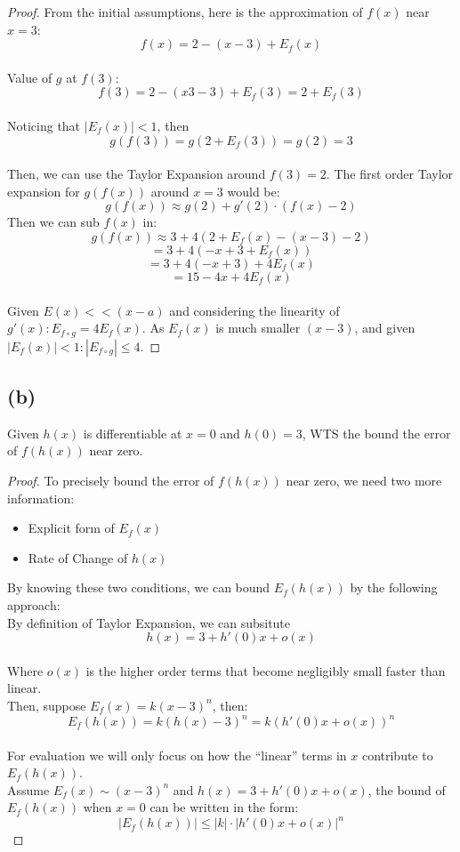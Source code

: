 \documentclass{article}
\begin{document}
\begin{proof}
    From the initial assumptions, here is the approximation of $f(x)$ near $x = 3$: 
    \[f(x) = 2 - (x - 3) + E_f(x)\]
    \\
    Value of $g$ at $f(3)$:
    \[ f(3) = 2 - (x3- 3) + E_f(3) = 2 + E_f(3) \]
    \\
    Noticing that $|E_f(x)| < 1$, then
    \[ g(f(3)) = g(2 + E_f(3)) = g(2) = 3 \]
    \\
    Then, we can use the Taylor Expansion around $f(3) = 2$. 
    The first order Taylor expansion for $g(f(x))$ around $x = 3$ would be:
    \[ g(f(x)) \approx g(2) + g'(2) \cdot (f(x) - 2) \]
    Then we can sub $f(x)$ in:
    \[ g(f(x)) \approx 3 + 4(2 + E_f(x) - (x - 3) - 2) \]
    \[ = 3 + 4(-x + 3 + E_f(x)) \]
    \[ = 3 + 4(-x + 3) + 4E_f(x) \]
    \[ = 15 - 4x + 4E_f(x) \]
    \\
    Given $E(x) << (x - a)$  and considering the linearity of \( g'(x): E_{f \circ g} = 4E_f(x) \).
    As $E_f(x)$ is much smaller $(x - 3)$, and given $|E_f(x)| < 1: |E_{f \circ g}| \leq 4$.
\end{proof}

\newpage

\subsection*{(b)}
Given $h(x)$ is differentiable at $x = 0$ and $h(0) = 3$, WTS       the bound the
error of $f(h(x))$ near zero.
\\
\begin{proof}
    To precisely bound the error of $f(h(x))$ near zero, we need two more information:
    \begin{itemize}
        \item Explicit form of $E_f(x)$
        \item Rate of Change of $h(x)$
    \end{itemize}

    By knowing these two conditions, we can bound $E_f(h(x))$ by the following approach:
    \\
    By definition of Taylor Expansion, we can subsitute
    \[ h(x) = 3 + h'(0)x + o(x) \]
    \\
    Where $o(x)$ is the higher order terms that become negligibly small faster than linear.
    \\
    Then, suppose $E_f(x) = k(x - 3)^n$, then:
    \[ E_f(h(x)) = k(h(x) - 3)^n = k(h'(0)x + o(x))^n \]
    \\
    For evaluation we will only focus on how the ``linear'' terms in $x$ contribute to $E_f(h(x))$.
    \\
    Assume $E_f(x) \sim (x - 3)^n$ and $h(x) = 3 + h'(0)x + o(x)$, the bound of $E_f(h(x))$ when $x = 0$ can be written in the form:
    \[ |E_f(h(x))| \leq |k| \cdot |h'(0)x + o(x)|^n \]

\end{proof}
\end{document}
